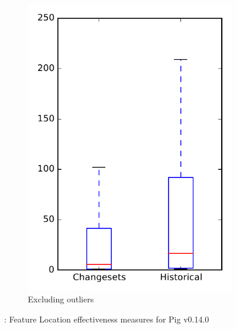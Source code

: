 \begin{figure}
\begin{subfigure}{.4\textwidth}
        \includegraphics[height=0.4\textheight]{figures/flt/rq2_pig_no_outlier}
        \caption{Excluding outliers}\label{fig:flt:rq2:pig_no_outlier}
    \end{subfigure}
\caption{\ftwo: Feature Location effectiveness measures for Pig v0.14.0}
\label{fig:flt:rq2:pig}
\end{figure}
